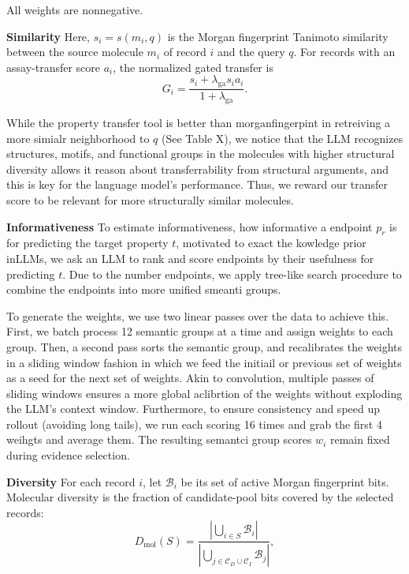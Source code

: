 All weights are nonnegative.

\textbf{Similarity} Here, $s_i=s(m_i,q)$ is the Morgan fingerprint Tanimoto similarity between the source molecule $m_i$ of record $i$ and the query $q$. For records with an assay-transfer score $a_i$, the normalized gated transfer is
\begin{equation}
    G_i=\frac{s_i+\lambda_{\mathrm{ga}}s_i a_i}
    {1+\lambda_{\mathrm{ga}}}.
    \label{eq:gated-relevance}
\end{equation}

While the property transfer tool is better than morganfingerpint in retreiving a more simialr neighborhood to $q$ (See Table X), we notice that the LLM recognizes structures, motifs, and functional groups in the molecules with higher structural diversity allows it reason about transferrability from structural arguments, and this is key for the language model's performance. Thus, we reward our transfer score to be relevant for more structurally similar molecules.

\textbf{Informativeness} To estimate informativeness, how informative a endpoint $p_r$ is for predicting the target property $t$, motivated to exact the kowledge prior inLLMs, we ask an LLM to rank and score endpoints by their usefulness for predicting $t$. Due to the number endpoints, we apply tree-like search procedure to combine the endpoints into more unified smeanti groups.

To generate the weights, we use two linear passes over the data to achieve this. First, we batch process 12 semantic groups at a time and assign weights to each group. Then, a second pass sorts the semantic group, and recalibrates the weights in a sliding window fashion in which we feed the initiail or previous set of weights as a seed for the next set of weights. Akin to convolution, multiple passes of sliding windows ensures a more global aclibrtion of the weights without exploding the LLM's context window. Furthermore, to ensure consistency and speed up rollout (avoiding long tails), we run each scoring 16 times and grab the first 4 weihgts and average them. The resulting semantci group scores $w_i$ remain fixed during evidence selection.

\textbf{Diversity} For each record $i$, let $\mathcal{B}_i$ be its set of active Morgan fingerprint bits. Molecular diversity is the fraction of candidate-pool bits covered by the selected records:
\begin{equation}
D_{\mathrm{mol}}(S)
=
\frac{\left|\bigcup_{i\in S}\mathcal{B}_i\right|}
{\left|\bigcup_{j\in\mathcal{C}_D\cup\mathcal{C}_I}\mathcal{B}_j\right|},
\label{eq:molecular-diversity}
\end{equation}

